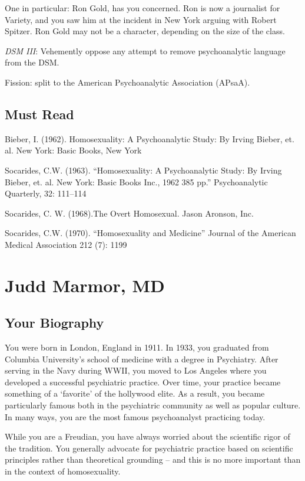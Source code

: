 \begin{refsection}
One in particular: Ron Gold, has you concerned. Ron is now a journalist for Variety, and you saw him at the incident in New York arguing with Robert Spitzer. Ron Gold may not be a character, depending on the size of the class.

\emph{DSM III}: Vehemently oppose any attempt to remove psychoanalytic language from the DSM.

Fission: split to the American Psychoanalytic Association (APsaA).

\section{Must Read}
\label{mustread}

Bieber, I. (1962). Homosexuality: A Psychoanalytic Study: By Irving Bieber, et. al. New York: Basic Books, New York

Socarides, C.W. (1963). ``Homosexuality: A Psychoanalytic Study: By Irving Bieber, et. al. New York: Basic Books Inc., 1962 385 pp.'' Psychoanalytic Quarterly, 32: 111--114

Socarides, C. W. (1968).The Overt Homosexual. Jason Aronson, Inc.

Socarides, C.W. (1970). ``Homosexuality and Medicine'' Journal of the American Medical Association 212 (7): 1199

\chapter{Judd Marmor, MD}
\label{juddmarmormd}

\section{Your Biography}
\label{yourbiography}

You were born in London, England in 1911. In 1933, you graduated from Columbia University's school of medicine with a degree in Psychiatry. After serving in the Navy during WWII, you moved to Los Angeles where you developed a successful psychiatric practice. Over time, your practice became something of a `favorite' of the hollywood elite. As a result, you became particularly famous both in the psychiatric community as well as popular culture. In many ways, you are the most famous psychoanalyst practicing today.

While you are a Freudian, you have always worried about the scientific rigor of the tradition. You generally advocate for psychiatric practice based on scientific principles rather than theoretical grounding – and this is no more important than in the context of homosexuality.


\end{refsection}
